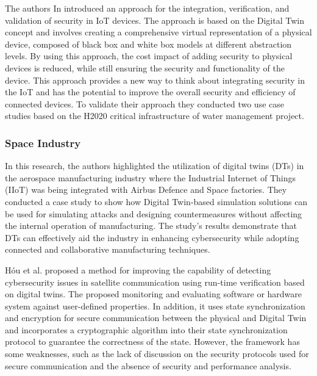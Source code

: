 The authors In\cite{maillet-contozEndtoendSecurityValidation2020} introduced an approach for the integration, verification, and validation of security in IoT devices. The approach is based on the Digital Twin concept and involves creating a comprehensive virtual representation of a physical device, composed of black box and white box models at different abstraction levels. By using this approach, the cost impact of adding security to physical devices is reduced, while still ensuring the security and functionality of the device. This approach provides a new way to think about integrating security in the IoT and has the potential to improve the overall security and efficiency of connected devices. To validate their approach they conducted two use case studies based on the H2020 critical infrastructure of water management project.

\subsubsection*{Space Industry}

In \cite{adrienbacueDigitalTwinsEnhanced2022} this research, the authors highlighted the utilization of digital twins (DTs) in the aerospace manufacturing industry where the Industrial Internet of Things (IIoT) was being integrated with Airbus Defence and Space factories. They conducted a case study to show how Digital Twin-based simulation solutions can be used for simulating attacks and designing countermeasures without affecting the internal operation of manufacturing. The study's results demonstrate that DTs can effectively aid the industry in enhancing cybersecurity while adopting connected and collaborative manufacturing techniques.

Hóu et al.\cite{houDigitalTwinRuntime2022} proposed a method for improving the capability of detecting cybersecurity issues in satellite communication using run-time verification based on digital twins. The proposed monitoring and evaluating software or hardware system against user-defined properties. In addition, it uses state synchronization and encryption for secure communication between the physical and Digital Twin and incorporates a cryptographic algorithm into their state synchronization protocol to guarantee the correctness of the state. However, the framework has some weaknesses, such as the lack of discussion on the security protocols used for secure communication and the absence of security and performance analysis.

